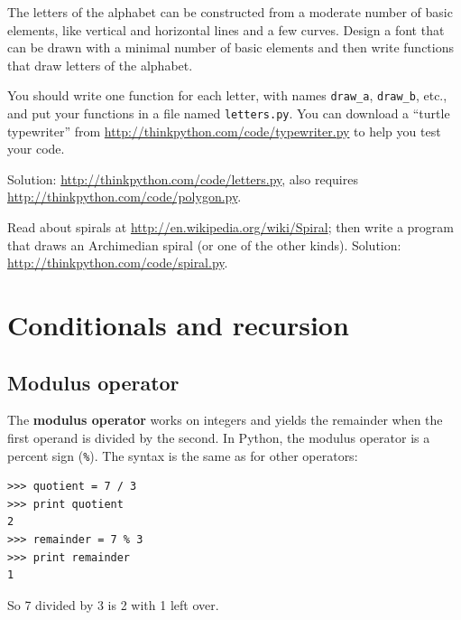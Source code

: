 \documentclass[10pt]{book}
\begin{document}
\begin{exercise}

The letters of the alphabet can be constructed from a moderate number
of basic elements, like vertical and horizontal lines and a few
curves.  Design a font that can be drawn with a minimal number of
basic elements and then write functions that draw letters of the
alphabet.

You should write one function for each letter, with names
\verb"draw_a", \verb"draw_b", etc., and put your functions
in a file named {\tt letters.py}.  You can download a
``turtle typewriter'' from \url{http://thinkpython.com/code/typewriter.py}
to help you test your code.

Solution: \url{http://thinkpython.com/code/letters.py}, also requires
\url{http://thinkpython.com/code/polygon.py}.

\end{exercise}

\begin{exercise}

Read about spirals at \url{http://en.wikipedia.org/wiki/Spiral}; then
write a program that draws an Archimedian spiral (or one of the other
kinds).  Solution: \url{http://thinkpython.com/code/spiral.py}.

\end{exercise}


\chapter{Conditionals and recursion}

\section{Modulus operator}

The {\bf modulus operator} works on integers and yields the remainder
when the first operand is divided by the second.  In Python, the
modulus operator is a percent sign (\verb"%").  The syntax is the same
as for other operators:

\begin{verbatim}
>>> quotient = 7 / 3
>>> print quotient
2
>>> remainder = 7 % 3
>>> print remainder
1
\end{verbatim}
%
So 7 divided by 3 is 2 with 1 left over.
\end{document}
